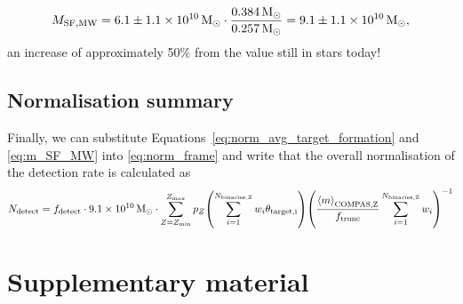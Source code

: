 \begin{equation}
    M_{\rm SF, MW} = 6.1 \pm 1.1 \times 10^{10} \unit{M_{\odot}} \cdot \frac{0.384 \unit{M_{\odot}}}{0.257 \unit{M_{\odot}}} = 9.1 \pm 1.1 \times 10^{10} \unit{M_{\odot}},
\end{equation}
an increase of approximately 50\% from the value still in stars today!

\subsection{Normalisation summary}
Finally, we can substitute Equations~\ref{eq:norm_avg_target_formation} and \ref{eq:m_SF_MW} into \ref{eq:norm_frame} and write that the overall normalisation of the detection rate is calculated as
\begin{equation}
    N_{\rm detect} = f_{\rm detect} \cdot 9.1 \times 10^{10} \unit{M_{\odot}} \cdot \sum_{Z=Z_{\rm min}}^{Z_{\rm max}} p_{Z} \qty(\sum_{i=1}^{N_{\rm binaries, Z}} w_i \theta_{\rm target, i}) \qty(\frac{\avg{m}_{\rm COMPAS, Z}}{f_{\rm trunc}} \sum_{i=1}^{N_{\rm binaries, Z}} w_i)^{-1}
\end{equation}

\newpage

\section{Supplementary material}

